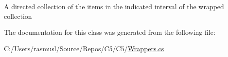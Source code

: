 A directed collection of the items in the indicated interval of the wrapped collection

The documentation for this class was generated from the following file\+:\begin{DoxyCompactItemize}
\item 
C\+:/\+Users/rasmusl/\+Source/\+Repos/\+C5/\+C5/\hyperlink{_wrappers_8cs}{Wrappers.\+cs}\end{DoxyCompactItemize}
